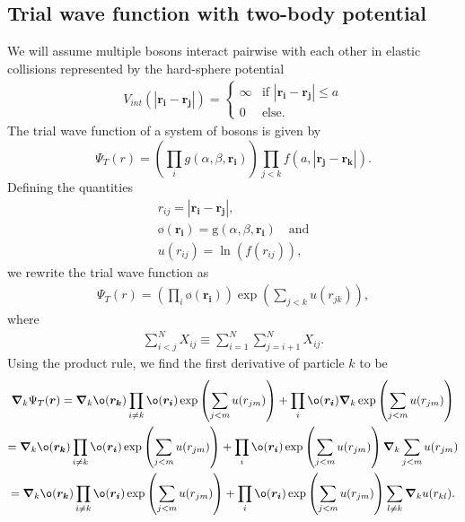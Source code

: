 \subsection{Trial wave function with two-body potential}
\label{sec:Trial wave function with two-body potential}
We will assume multiple bosons interact pairwise with each other in elastic collisions
represented by the hard-sphere potential 
\begin{equation}
\label{eq:V_int}
\begin{gathered}
V _{int} (|\boldsymbol{r_i}-\boldsymbol{r_j}|)= 
	\left\{
		\begin{array}{lll}
			\infty & \mbox{if } |\boldsymbol{r_i}-\boldsymbol{r_j}|
			\le a \\
			0 & \mbox{else.} 
		\end{array}
	\right.
\end{gathered}
\end{equation}
The trial wave function of a system of bosons is given by
\begin{equation}
	\label{eq:trial wave function with two-body potential}
	\Psi_T(r) = \left( \prod_{i}^{}g(\alpha ,\beta ,\boldsymbol{r_i})\right) \prod_{j<k}^{} f(a,|\boldsymbol{r_j-r_k}|).
\end{equation}
Defining the quantities
\begin{equation}
	\label{eq:definitions}
	\begin{gathered}
		r _{ij} = |\boldsymbol{r_i-r_j}|,\\
		ø(\boldsymbol{r_i})=\text{g}(\alpha ,\beta ,\boldsymbol{r_i})\quad \text{and}\\
		u(r _{ij})= \ln(f(r _{ij})),
	\end{gathered}
\end{equation}
we rewrite the trial wave function as
\begin{gather*}
	\Psi_T(r) = \left( \prod_{i}^{}ø(\boldsymbol{r_i})\right) \exp\left(\sum_{j<k}^{} u(r _{jk})\right),
\end{gather*}
where
\begin{gather*}
	\sum_{i<j}^{N} X _{ij}\equiv \sum_{i=1}^{N} \sum_{j=i+1}^{N} X _{ij}.
\end{gather*}
Using the product rule, we find the first derivative of particle $k$ to be
\begin{gather*}
	\grad _{k} \Psi _{T}(\boldsymbol{r}) = \grad _{k}ø(\boldsymbol{r_k})\prod_{i\neq k}^{}ø(\boldsymbol{r_i})\exp\left(\sum_{j<m}^{} u(r _{jm})\right) + \prod_{i}^{}ø(\boldsymbol{r_i})\grad _k\exp\left(\sum_{j<m}^{} u(r _{jm})\right)\\
	= \grad _{k}ø(\boldsymbol{r_k})\prod_{i\neq k}^{}ø(\boldsymbol{r_i})\exp\left(\sum_{j<m}^{} u(r _{jm})\right) + \prod_{i}^{}ø(\boldsymbol{r_i})\exp\left(\sum_{j<m}^{} u(r _{jm})\right)\grad_k \sum_{j<m}^{} u(r _{jm})\\
	= \grad _{k}ø(\boldsymbol{r_k})\prod_{i\neq k}^{}ø(\boldsymbol{r_i})\exp\left(\sum_{j<m}^{} u(r _{jm})\right) + \prod_{i}^{}ø(\boldsymbol{r_i})\exp\left(\sum_{j<m}^{} u(r _{jm})\right) \sum_{l \neq  k} \boldsymbol{\nabla} _ku(r _{kl}).
\end{gather*}
